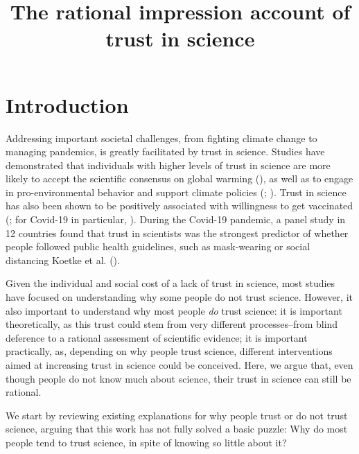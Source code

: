 \documentclass[
  jou,
  floatsintext,
  longtable,
  nolmodern,
  notxfonts,
  notimes,
  colorlinks=true,linkcolor=blue,citecolor=blue,urlcolor=blue]{apa7}
\title{The rational impression account of trust in science}
\begin{document}
\maketitle


\setcounter{secnumdepth}{-\maxdimen} %

\setlength\LTleft{0pt}


\section{Introduction}\label{introduction}

Addressing important societal challenges, from fighting climate change
to managing pandemics, is greatly facilitated by trust in science.
Studies have demonstrated that individuals with higher levels of trust
in science are more likely to accept the scientific consensus on global
warming (), as well as to engage in pro-environmental behavior and support
climate policies (;
). Trust in science has also been shown to be positively
associated with willingness to get vaccinated
(; for
Covid-19 in particular,
). During the Covid-19 pandemic, a panel study in 12 countries
found that trust in scientists was the strongest predictor of whether
people followed public health guidelines, such as mask-wearing or social
distancing Koetke et al.
().

Given the individual and social cost of a lack of trust in science, most
studies have focused on understanding why some people do not trust
science. However, it also important to understand why most people
\emph{do} trust science: it is important theoretically, as this trust
could stem from very different processes--from blind deference to a
rational assessment of scientific evidence; it is important practically,
as, depending on why people trust science, different interventions aimed
at increasing trust in science could be conceived. Here, we argue that,
even though people do not know much about science, their trust in
science can still be rational.

We start by reviewing existing explanations for why people trust or do
not trust science, arguing that this work has not fully solved a basic
puzzle: Why do most people tend to trust science, in spite of knowing so
little about it?
\end{document}
